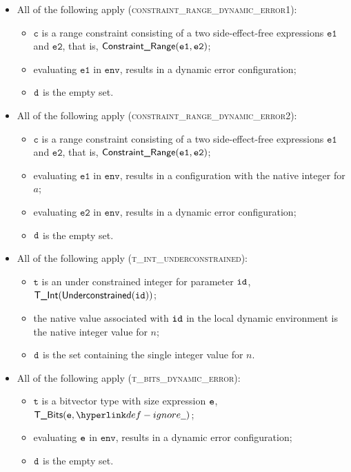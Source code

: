 \documentclass{book}
\newcommand\env[0]{\texttt{env}}
\newcommand\vc[0]{\texttt{c}}
\newcommand\vt[0]{\texttt{t}}
\newcommand\veone[0]{\texttt{e1}}
\newcommand\vetwo[0]{\texttt{e2}}
\begin{document}
\begin{itemize}
  \item All of the following apply (\textsc{constraint\_range\_dynamic\_error1}):
  \begin{itemize}
    \item $\vc$ is a range constraint consisting of a two side-effect-free expressions $\veone$ and $\vetwo$, that is, $\ConstraintRange(\veone, \vetwo)$;
    \item evaluating $\veone$ in $\env$, results in a dynamic error configuration;
    \item $\texttt{d}$ is the empty set.
  \end{itemize}

  \item All of the following apply (\textsc{constraint\_range\_dynamic\_error2}):
  \begin{itemize}
    \item $\vc$ is a range constraint consisting of a two side-effect-free expressions $\veone$ and $\vetwo$, that is, $\ConstraintRange(\veone, \vetwo)$;
    \item evaluating $\veone$ in $\env$, results in a configuration with the native integer for $a$;
    \item evaluating $\vetwo$ in $\env$, results in a dynamic error configuration;
    \item $\texttt{d}$ is the empty set.
  \end{itemize}

  \item All of the following apply (\textsc{t\_int\_underconstrained}):
  \begin{itemize}
    \item $\vt$ is an under constrained integer for parameter $\texttt{id}$, \\ $\textsf{T\_Int}(\textsf{Underconstrained}(\texttt{id}))$;
    \item the native value associated with $\texttt{id}$ in the local dynamic environment is the native integer value for $n$;
    \item $\texttt{d}$ is the set containing the single integer value for $n$.
  \end{itemize}

  \item All of the following apply (\textsc{t\_bits\_dynamic\_error}):
  \begin{itemize}
    \item $\vt$ is a bitvector type with size expression $\texttt{e}$, $\TBits(\ve, \Ignore)$;
    \item evaluating $\texttt{e}$ in $\env$, results in a dynamic error configuration;
    \item $\texttt{d}$ is the empty set.
  \end{itemize}


\end{itemize}
\end{document}
